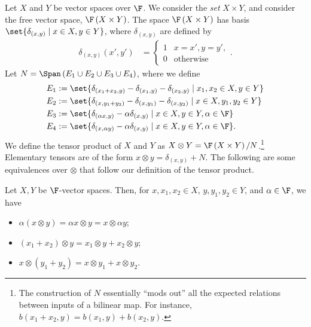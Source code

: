 \documentclass[10pt]{mypackage}
\begin{document}
Let $X$ and $Y$ be vector spaces over $\F$. We consider the \textit{set} $X\times Y$, and consider the free vector space, $\F\left(X\times Y\right)$. The space $\F\left(X\times Y\right)$ has basis $\set{\delta_{\left(x,y\right)}\mid x\in X,y\in Y}$, where $\delta_{(x,y)}$ are defined by
\begin{align*}
  \delta_{(x,y)}\left(x',y'\right) &= \begin{cases}
    1 & x=x',y=y',\\
    0 & \text{otherwise}
  \end{cases}.
\end{align*}
Let $N = \Span\left(E_1\cup E_2\cup E_3\cup E_4\right)$, where we define
\begin{align*}
  E_{1} &:= \set{\delta_{\left(x_1 + x_2,y\right)} - \delta_{\left(x_1,y\right)} - \delta_{\left(x_2,y\right)}\mid x_1,x_2\in X,y\in Y}\\
  E_{2} &:= \set{\delta_{\left(x,y_1 + y_2\right)} - \delta_{\left(x,y_1\right)} - \delta_{\left(x,y_2\right)}\mid x\in X,y_1,y_2\in Y}\\
  E_{3} &:= \set{\delta_{\left(\alpha x,y\right)} - \alpha \delta_{\left(x,y\right)}\mid x\in X,y\in Y,\alpha\in \F}\\
  E_{4} &:= \set{\delta_{\left(x,\alpha y\right)} - \alpha \delta_{\left(x,y\right)}\mid x\in X,y\in Y,\alpha\in \F}.
\end{align*}
We define the tensor product of $X$ and $Y$ as $X\otimes Y = \F\left(X\times Y\right)/N$.\footnote{The construction of $N$ essentially ``mods out'' all the expected relations between inputs of a bilinear map. For instance, $b\left(x_1 + x_2,y\right) = b\left(x_1,y\right) + b\left(x_2,y\right)$.} Elementary tensors are of the form $x\otimes y = \delta_{\left(x,y\right)} + N$. The following are some equivalences over $\otimes$ that follow our definition of the tensor product.
\begin{lemma}
  Let $X,Y$ be $\F$-vector spaces. Then, for $x,x_1,x_2\in X$, $y,y_1,y_2\in Y$, and $\alpha\in \F$, we have
  \begin{itemize}
    \item $\displaystyle \alpha\left(x\otimes y\right) = \alpha x\otimes y = x\otimes \alpha y$;
    \item $\displaystyle \left(x_1 + x_2\right)\otimes y = x_1\otimes y + x_2\otimes y$;
    \item $x\otimes \left(y_1 + y_2\right) = x\otimes y_1 + x\otimes y_2$.
  \end{itemize}
\end{lemma}
\end{document}
